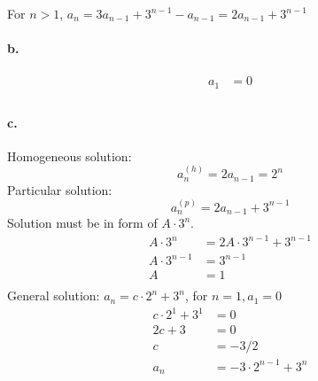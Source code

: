 \documentclass[11pt]{article}
\begin{document}
For $n > 1$, $a_n = 3a_{n-1}+3^{n-1}-a_{n-1}=2a_{n-1}+3^{n-1}$
\paragraph{\textbf{b.}}
\begin{align*}
	a_1 &= 0 \\
\end{align*}
\paragraph{\textbf{c.}}
Homogeneous solution:
\begin{equation*}
	a_n^{(h)} = 2a_{n-1}=2^n
\end{equation*}
Particular solution:
\begin{equation*}
	a_n^{(p)} = 2a_{n-1}+3^{n-1}
\end{equation*}
Solution must be in form of $A\cdot3^n$.
\begin{align*}
	A\cdot3^n&=2A\cdot3^{n-1}+3^{n-1}\\
	A\cdot3^{n-1}&=3^{n-1} \\
	A&=1 \\
\end{align*}
General solution: $a_n=c\cdot2^n+3^n$, for $n=1, a_1=0$
\begin{align*}
	c\cdot2^1+3^1&=0\\
	2c+3&=0 \\
	c&=-3/2 \\
	a_n&=-3\cdot2^{n-1}+3^n
\end{align*}
\end{document}
